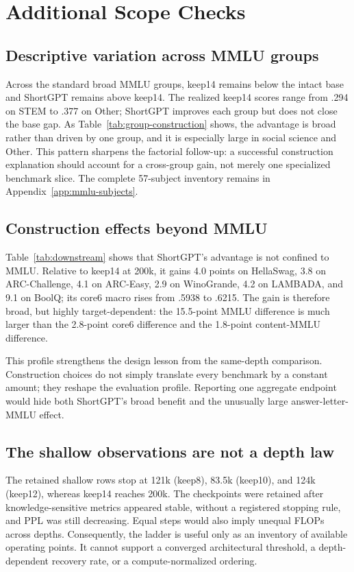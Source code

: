 \section{Additional Scope Checks}
\label{sec:analysis}

\subsection{Descriptive variation across MMLU groups}


Across the standard broad MMLU groups, keep14 remains below the intact base and
ShortGPT remains above keep14. The realized keep14 scores range from .294 on
STEM to .377 on Other; ShortGPT improves each group but does not close the
base gap. As Table~\ref{tab:group-construction} shows, the advantage is broad
rather than driven by one group, and it is especially large in social science
and Other. This pattern sharpens the factorial follow-up: a successful
construction explanation should account for a cross-group gain, not merely one
specialized benchmark slice. The complete 57-subject inventory remains in
Appendix~\ref{app:mmlu-subjects}.

\subsection{Construction effects beyond MMLU}


Table~\ref{tab:downstream} shows that ShortGPT's advantage is not confined to
MMLU. Relative to keep14 at 200k, it gains 4.0 points on HellaSwag, 3.8 on
ARC-Challenge, 4.1 on ARC-Easy, 2.9 on WinoGrande, 4.2 on LAMBADA, and 9.1 on
BoolQ; its core6 macro rises from .5938 to .6215. The gain is therefore broad,
but highly target-dependent: the 15.5-point MMLU difference is much larger than
the 2.8-point core6 difference and the 1.8-point content-MMLU difference.

This profile strengthens the design lesson from the same-depth comparison.
Construction choices do not simply translate every benchmark by a constant
amount; they reshape the evaluation profile. Reporting one aggregate endpoint
would hide both ShortGPT's broad benefit and the unusually large
answer-letter-MMLU effect.

\subsection{The shallow observations are not a depth law}
The retained shallow rows stop at 121k (keep8), 83.5k (keep10), and 124k
(keep12), whereas keep14 reaches 200k. The checkpoints were retained after
knowledge-sensitive metrics appeared stable, without a registered stopping
rule, and PPL was still decreasing. Equal steps would also imply unequal FLOPs
across depths. Consequently, the ladder is useful only as an inventory of
available operating points. It cannot support a converged architectural
threshold, a depth-dependent recovery rate, or a compute-normalized ordering.

